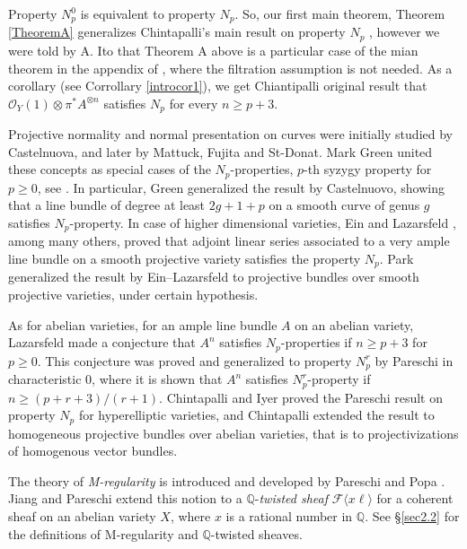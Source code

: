 \documentclass[11pt,letter]{amsart}
\numberwithin{equation}{section}
\begin{document}
  
Property $N_p^0$ is equivalent to property $N_p$. So, our first main theorem, Theorem \ref{TheoremA} generalizes Chintapalli's main result on property $N_p$ \cite[Theorem 1.2]{Chi19}, however we were told by A. Ito that Theorem A above is a particular case of the mian theorem in the appendix of \cite{Raychaudhury+2024+19+37}, where the filtration assumption is not needed. As a corollary (see Corrollary \ref{introcor1}), we get Chiantipalli original result that $\mathcal{O}_Y(1)\otimes\pi^* A^{\otimes n}$ satisfies $N_p$ for every $n\geq p+3$.
    
    
  
Projective normality and normal presentation on curves were initially studied by Castelnuova, and later by Mattuck, Fujita and St-Donat. Mark Green united these concepts as special cases of the $N_p$-properties, $p$-th syzygy property for $p\geq 0$,   see \cite{green1984koszul,GreenII,GreenIII}. In particular, Green generalized the result by Castelnuovo, showing that a line bundle of degree at least $2g+1+p$ on a smooth curve of genus $g$ satisfies $N_p$-property. In case of higher dimensional varieties, Ein and Lazarsfeld \cite{EL}, among many others, proved that adjoint linear series associated to a very ample line bundle on a smooth projective variety satisfies the property $N_p$. Park \cite{Park} generalized the result by Ein--Lazarsfeld to projective bundles over smooth projective varieties, under certain hypothesis.
  
  As for abelian varieties, for an ample line bundle $A$ on an abelian variety,  Lazarsfeld made a conjecture that $A^n$ satisfies $N_p$-properties if $n\geq p+3$ for $p\geq 0$. This conjecture was proved and generalized to property $N_p^r$ by Pareschi \cite{pareschi2000syzygies} in characteristic $0$, where it is shown that $A^n$ satisfies $N_p^r$-property if $n\geq (p+r+3)/(r+1)$. Chintapalli and Iyer \cite{ChiIyer} proved the Pareschi result on property $N_p$ for hyperelliptic varieties, and Chintapalli \cite[Theorem 1.2]{Chi19} extended the result to homogeneous projective bundles over abelian varieties, that is to projectivizations of homogenous vector bundles. %

  
 The theory of {\it M-regularity} is introduced and developed by Pareschi and Popa \cite{PP03,PP04,PP11}. Jiang and Pareschi \cite{JiPa2020} extend this notion to a $\mathbb{Q}$-{\it twisted sheaf} $\mathcal{F}\langle x\ell\rangle$ for a coherent sheaf on an abelian variety $X$, where $x$ is a rational number in $\mathbb{Q}$. See \S\ref{sec2.2} for the definitions of M-regularity and $\mathbb{Q}$-twisted sheaves. %
  
\end{document}

